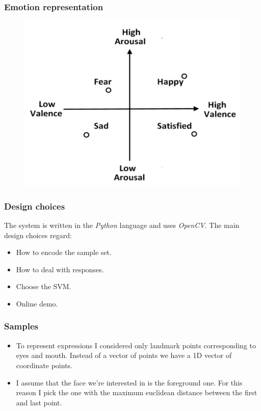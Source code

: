 \documentclass{beamer}
\begin{document}
\begin{frame}
    \frametitle{Emotion representation}
    \begin{figure}
        \centering
        \includegraphics[scale=0.3]{../report/images/emotion-classification.png}
    \end{figure}
\end{frame}

\begin{frame}
    \frametitle{Design choices}
    The system is written in the \textit{Python} language and uses \textit{OpenCV}.
    The main design choices regard:
    \begin{itemize}
        \item How to encode the sample set.
        \item How to deal with responses.
        \item Choose the SVM.
        \item Online demo.
    \end{itemize}
\end{frame}

\begin{frame}
    \frametitle{Samples}
    \begin{itemize}
        \item To represent expressions I considered only landmark points corresponding to eyes and mouth.
        Instead of a vector of points we have a 1D vector of coordinate points.
        
        \item I assume that the face we're interested in is the foreground one. For this reason I pick the one with the maximum euclidean distance between the first and last point.
    \end{itemize}
\end{frame}
\end{document}
